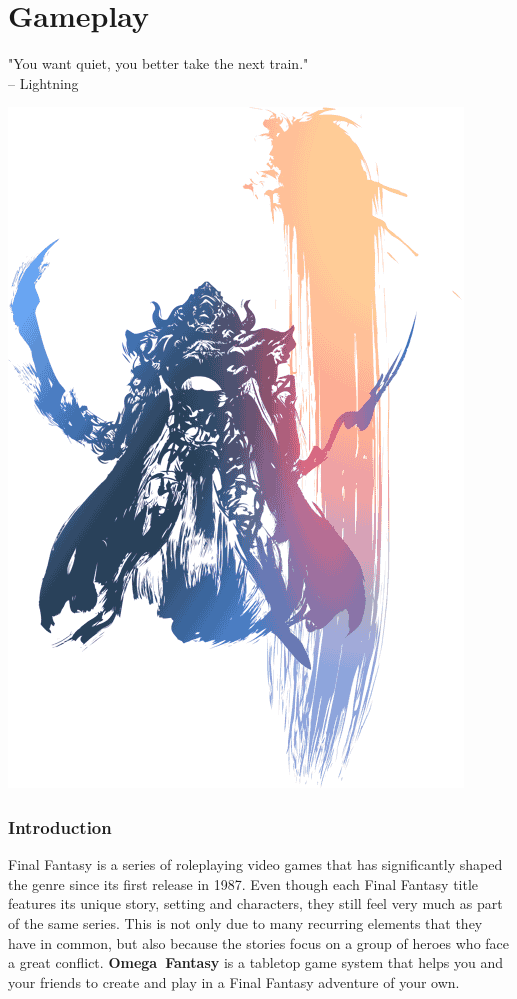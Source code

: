 \section*{\hypertarget{gameplay}{Gameplay}}
"You want quiet, you better take the next train."\\
\indent -- Lightning

\begin{center} \includegraphics[width=\columnwidth]{./art/images/ff12.png} \end{center}


\subsubsection*{Introduction}
Final Fantasy is a series of roleplaying video games that has significantly shaped the genre since its first release in 1987.
Even though each Final Fantasy title features its unique story, setting and characters, they still feel very much as part of the same series.
This is not only due to many recurring elements that they have in common, but also because the stories focus on a group of heroes who face a great conflict.
\mbox{\textbf{Omega Fantasy}} is a tabletop game system that helps you and your friends to create and play in a Final Fantasy adventure of your own.

